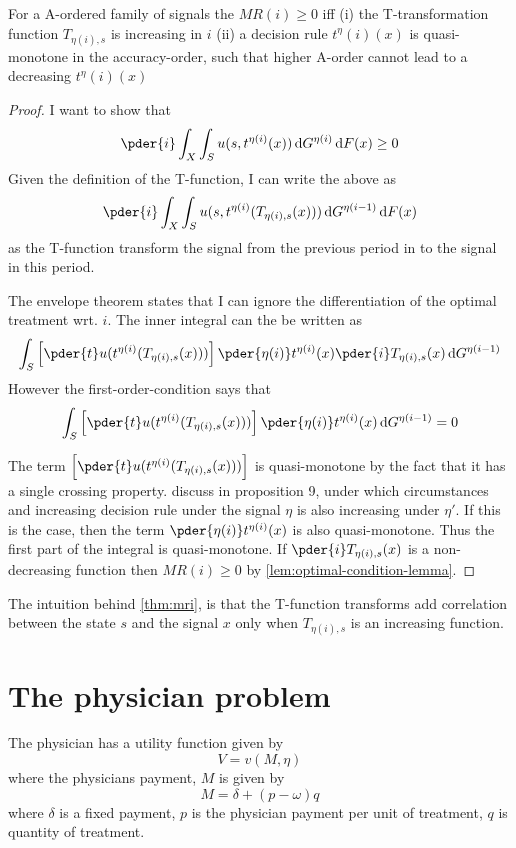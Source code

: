 \documentclass[10pt,a4paper]{article}
\begin{document}
\begin{theorem}\label{thm:mri}
For a A-ordered family of signals the \(MR(i)\geq0\) iff (i) the T-transformation function \(T_{\eta(i),s}\) is increasing in \(i\) (ii) a decision rule \(t^\eta(i)(x)\) is quasi-monotone in the accuracy-order, such that higher A-order cannot lead to a decreasing \(t^\eta(i)(x)\)
\end{theorem}
\begin{proof}
I want to show that
\[
	\pder{i}\int_X\int_S u(s,t^{\eta(i)}(x))\dif G^{\eta(i)}\dif F(x)\geq0
\]
Given the definition of the T-function, I can write the above as
\[
	\pder{i}\int_X\int_S u(s,t^{\eta(i)}(T_{\eta(i),s}(x)))\dif G^{\eta(i-1)}\dif F(x)
\]
as the T-function transform the signal from the previous period in to the signal in this period.

The envelope theorem states that I can ignore the differentiation of the optimal treatment wrt. \(i\). The inner integral can the be written as
\[
	\int_S \left[\pder{t}u(t^{\eta(i)}(T_{\eta(i),s}(x)))\right]\pder{\eta(i)}t^{\eta(i)}(x)\pder{i}T_{\eta(i),s}(x)\dif G^{\eta(i-1)}
\]
However the first-order-condition says that
\[
	\int_S \left[\pder{t}u(t^{\eta(i)}(T_{\eta(i),s}(x)))\right]\pder{\eta(i)}t^{\eta(i)}(x)\dif G^{\eta(i-1)}=0
\]

The term \(\left[\pder{t}u(t^{\eta(i)}(T_{\eta(i),s}(x)))\right]\) is quasi-monotone by the fact that it has a single crossing property. \textcite{Quah2009} discuss in proposition 9, under which circumstances and increasing decision rule under the signal \(\eta\) is also increasing under \(\eta'\). If this is the case, then the term \(\pder{\eta(i)}t^{\eta(i)}(x)\) is also quasi-monotone. Thus the first part of the integral is quasi-monotone. If \(\pder{i}T_{\eta(i),s}(x)\) is a non-decreasing function then \(MR(i)\geq0\) by \cref{lem:optimal-condition-lemma}.
\end{proof}
The intuition behind \cref{thm:mri}, is that the T-function transforms add correlation between the state \(s\) and the signal \(x\) only when \(T_{\eta(i),s}\) is an increasing function.

\section{The physician problem}
The physician has a utility function given by
\[
	V=v(M,\eta)
\]
where the physicians payment, \(M\) is given by
\[
	M=\delta+(p-\omega)q
\]
where \(\delta\) is a fixed payment, \(p\) is the physician payment per unit of treatment, \(q\) is quantity of treatment.
\end{document}
